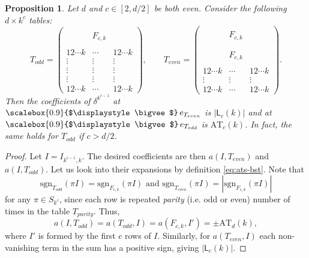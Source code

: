 \documentclass[12pt, reqno]{amsart}
\newtheorem{proposition}[theorem]{Proposition}
\theoremstyle{definition}
\newcommand{\sgn}{\mathrm{sgn}}
\let\oldbigvee\bigvee
\renewcommand{\bigvee}{
  \mathop{
    \vcenter{
      \hbox{\scalebox{0.9}{$\displaystyle\oldbigvee$}}
    }
  }
}
\begin{document}
\begin{proposition}
    Let $d$ and $ c \in [2, d/2]$ be both even. Consider the following $d \times k^{c}$ tables:
    $$
    T_{odd} = \begin{pmatrix}
        ~ & ~ & ~\\
        ~ & F_{c,k} & ~\\
        ~ & ~ & ~\\
        \hline
        12 \cdots k & \cdots & 12\cdots k\\
        \vdots & \vdots & \vdots\\
        \vdots & \vdots & \vdots\\
        \vdots & \vdots & \vdots\\
        12\cdots k & \cdots & 12\cdots k
    \end{pmatrix}, 
    \qquad
    T_{even} = \begin{pmatrix}
        ~ & ~ & ~\\
        ~ & F_{c,k} & ~\\
        ~ & ~ & ~\\
        \hline
        ~ & ~ & ~\\
        ~ & F_{c,k} & ~\\
        ~ & ~ & ~\\
        \hline
        12\cdots k & \cdots & 12\cdots k\\
        \vdots & \vdots & \vdots\\
        12\cdots k & \cdots & 12\cdots k
    \end{pmatrix}.
    $$ 
    Then the coefficients of $\delta^{k^{c-1}}$ at $\bigvee e_{T_{even}}$ is $|\mathsf{L}_c(k)|$ and at $\bigvee e_{T_{odd}}$ is $\mathrm{AT}_c(k)$.
    In fact, the same holds for $T_{odd}$ if $c > d/2$.
\end{proposition}
\begin{proof}
    Let $I = I_{k^{c-1},k}$. The desired coefficients are then $a(I, T_{even})$ and $a(I, T_{odd})$. Let us look into their expansions by definition \eqref{eq:ats-bst}. Note that 
    $$\sgn_{T_{odd}}(\pi I) = \sgn_{F_{c,k}}(\pi I) \text{  and  }\sgn_{T_{even}}(\pi I) = |\sgn_{F_{c,k}}(\pi I)|$$ 
    for any $\pi \in S_{k^{c}}$, since each row is repeated \textit{parity} (i.e. odd or even) number of times in the table $T_{parity}$. Thus, 
    $$a(I, T_{odd}) = a(T_{odd}, I) = a(F_{c,k}, I') = \pm\mathrm{AT}_d(k),$$ 
    where $I'$ is formed by the first $c$ rows of $I$. Similarly, for $a(T_{even}, I)$ each non-vanishing term in the sum has a positive sign, giving $|\mathsf{L}_c(k)|$.
\end{proof}
\end{document}
